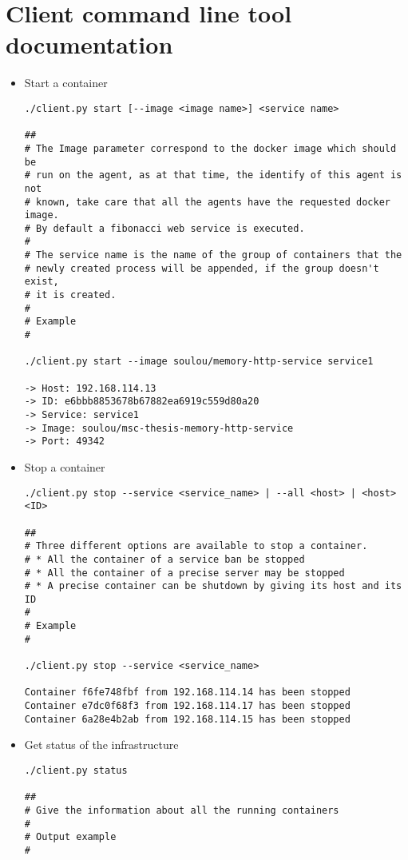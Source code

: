 
\chapter{Client command line tool documentation}
\lstset{language=Bash, basicstyle=\footnotesize\ttfamily}
\label{app:client-doc}

\vspace{1em}

\begin{itemize}
\item{Start a container
\begin{lstlisting}
./client.py start [--image <image name>] <service name>

##
# The Image parameter correspond to the docker image which should be
# run on the agent, as at that time, the identify of this agent is not
# known, take care that all the agents have the requested docker image.
# By default a fibonacci web service is executed.
#
# The service name is the name of the group of containers that the
# newly created process will be appended, if the group doesn't exist,
# it is created.
#
# Example
#

./client.py start --image soulou/memory-http-service service1

-> Host: 192.168.114.13
-> ID: e6bbb8853678b67882ea6919c559d80a20
-> Service: service1
-> Image: soulou/msc-thesis-memory-http-service
-> Port: 49342
\end{lstlisting}}
\item{Stop a container
\begin{lstlisting}
./client.py stop --service <service_name> | --all <host> | <host> <ID>

##
# Three different options are available to stop a container.
# * All the container of a service ban be stopped
# * All the container of a precise server may be stopped
# * A precise container can be shutdown by giving its host and its ID
#
# Example
#

./client.py stop --service <service_name>

Container f6fe748fbf from 192.168.114.14 has been stopped
Container e7dc0f68f3 from 192.168.114.17 has been stopped
Container 6a28e4b2ab from 192.168.114.15 has been stopped
\end{lstlisting}}
\item{Get status of the infrastructure
\begin{lstlisting}
./client.py status

##
# Give the information about all the running containers
#
# Output example
#


\end{lstlisting}}
\end{itemize}
